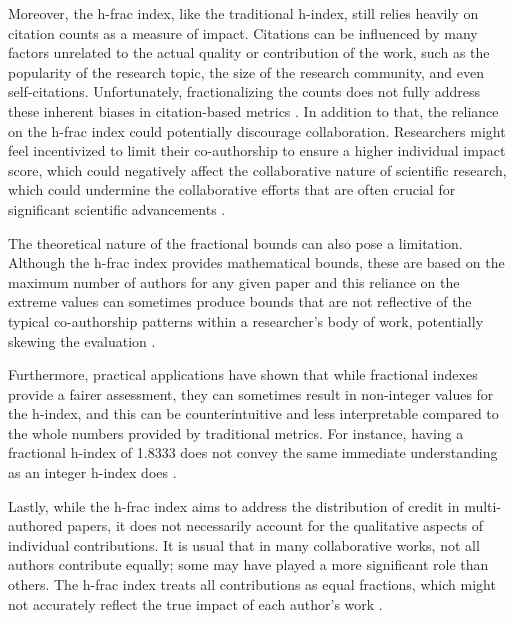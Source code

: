 Moreover, the h-frac index, like the traditional h-index, still relies heavily
on citation counts as a measure of impact. Citations can be influenced by many
factors unrelated to the actual quality or contribution of the work, such as
the popularity of the research topic, the size of the research community, and
even self-citations. Unfortunately, fractionalizing the counts does not fully
address these inherent biases in citation-based metrics
\cite{egghe2008mathematical}. In addition to that, the reliance on the h-frac
index could potentially discourage collaboration. Researchers might feel
incentivized to limit their co-authorship to ensure a higher individual impact
score, which could negatively affect the collaborative nature of scientific
research, which could undermine the collaborative efforts that are often
crucial for significant scientific advancements \cite{singhal2023analysis}.

The theoretical nature of the fractional bounds can also pose a limitation.
Although the h-frac index provides mathematical bounds, these are based on the
maximum number of authors for any given paper and this reliance on the extreme
values can sometimes produce bounds that are not reflective of the typical
co-authorship patterns within a researcher's body of work, potentially skewing
the evaluation \cite{egghe2008mathematical}.

Furthermore, practical applications have shown that while fractional indexes
provide a fairer assessment, they can sometimes result in non-integer values
for the h-index, and this can be counterintuitive and less interpretable
compared to the whole numbers provided by traditional metrics. For instance,
having a fractional h-index of 1.8333 does not convey the same immediate
understanding as an integer h-index does \cite{egghe2008mathematical}.

Lastly, while the h-frac index aims to address the distribution of credit in
multi-authored papers, it does not necessarily account for the qualitative
aspects of individual contributions. It is usual that in many collaborative
works, not all authors contribute equally; some may have played a more
significant role than others. The h-frac index treats all contributions as
equal fractions, which might not accurately reflect the true impact of each
author’s work \cite{egghe2008mathematical,singhal2023analysis}.

